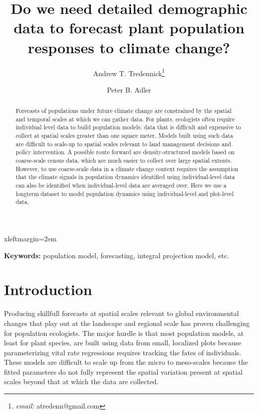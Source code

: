 \documentclass[12pt]{article}
\begin{document}



 {xleftmargin=2em}

\title{\LARGE Do we need detailed demographic data to forecast plant population responses to climate change?}
\author[]{\large Andrew T. Tredennick\footnote{\emph{email:} atredenn@gmail.com}}
\author[]{\large Peter B. Adler}
\maketitle

\begin{abstract}
\noindent Forecasts of populations under future climate change are constrained by the spatial and temporal scales at which we can gather data. For plants, ecologists often require individual level data to build population models; data that is difficult and expensive to collect at spatial scales greater than one square meter. Models built using such data are difficult to scale-up to spatial scales relevant to land management decisions and policy intervention. A possible route forward are density-structured models based on coarse-scale census data, which are much easier to collect over large spatial extents. However, to use coarse-scale data in a climate change context requires the assumption that the climate signals in population dynamics identified using individual-level data can also be identified when individual-level data are averaged over. Here we use a longterm dataset to model population dynamics using individual-level and plot-level data.   
\end{abstract}

\noindent{}\textbf{Keywords:} population model, forecasting, integral projection model, etc.

\section{Introduction}
Producing skillfull forecasts at spatial scales relevant to global environmental changes that play out at the landscape and regional scale has proven challenging for population ecologists. The major hurdle is that most population models, at least for plant species, are built using data from small, localized plots because parameterizing vital rate regressions requires tracking the fates of individuals. These models are difficult to scale up from the micro to meso-scales because the fitted parameters do not fully represent the spatial variation present at spatial scales beyond that at which the data are collected. 
\end{document}
